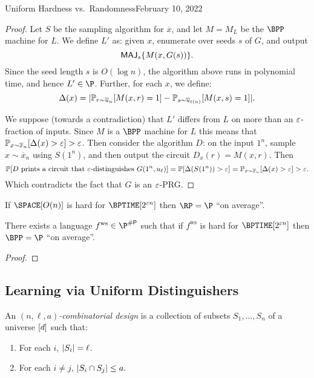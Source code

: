 \begin{lecture}{4}{Uniform Hardness vs.\ Randomness}{February 10, 2022}
\begin{proof}
	Let $S$ be the sampling algorithm for $\overline{x}$, and let $M = M_L$
	be the $\BPP$ machine for $L$. We define $L'$ as: given $x$, enumerate
	over seeds $s$ of $G$, and output
	\[ \textsf{MAJ}_{s} \{M(x, G(s)) \}. \]
	Since the seed length $s$ is $O(\log n)$, the algorithm above runs in
	polynomial time, and hence $L' \in \P$.
	Further, for each $x$, we define:
	\[
		\Delta(x) = \lvert
			\mathbb{P}_{r \sim \overline{u}_n}         [ M(x, r) = 1]
		  - \mathbb{P}_{s \sim \overline{u}_{\ell(n)}} [ M(x, s) = 1]
		  \rvert.
	\]

	We suppose (towards a contradiction) that $L'$ differs from $L$ on more
	than an $\varepsilon$-fraction of inputs. Since $M$ is a $\BPP$ machine for $L$
	this means that
	$\mathbb{P}_{x \sim \overline{x}_n}[\Delta(x) > \varepsilon] > \varepsilon$. Then consider
	the algorithm $D$: on the input $1^n$, sample $x \sim \overline{x}_n$ using
	$S(1^n)$, and then output the circuit $D_x(r) = M(x, r)$.
	Then
	\[
		\mathbb{P}[D \text{ prints a circuit that } \varepsilon \text{-distinguishes }
		G(1^n, u_{\ell})]
		= \mathbb{P}[\Delta(S(1^n)) > \varepsilon]
		= \mathbb{P}_{x \sim \overline{x}_n}[\Delta(x) > \varepsilon] > \varepsilon.
	\]
	Which contradicts the fact that $G$ is an $\varepsilon$-PRG.
\end{proof}

\begin{theorem}
	If
	$\SPACE\brac{O(n)}$ is hard for $\BPTIME\brac{2^{\eps n}}$
	then
	$\RP = \P$ ``on average''.
\end{theorem}

\newcommand{\fws}{\ensuremath{ f^{\text{ws}} }}
\begin{theorem}
	There exists a language $\fws \in \P^{\sharpp}$ such that if $\fws$
	is hard for $\BPTIME\brac{2^{\eps n}}$ then
	$\BPP = \P$ ``on average''.
\end{theorem}

\begin{proof}
\end{proof}

\subsection{Learning via Uniform Distinguishers}

\begin{definition}
  An \emph{$(n, \ell, a)$-combinatorial design} is a collection of subsets
	$S_1, \ldots , S_n$ of a universe $[d]$ such that:
	\begin{enumerate}
		\item For each $i$, $\lvert S_i\rvert = \ell$.
		\item For each $i \neq j$, $\lvert S_i \cap S_j\rvert \leq a.$
	\end{enumerate}
\end{definition}


\end{lecture}
